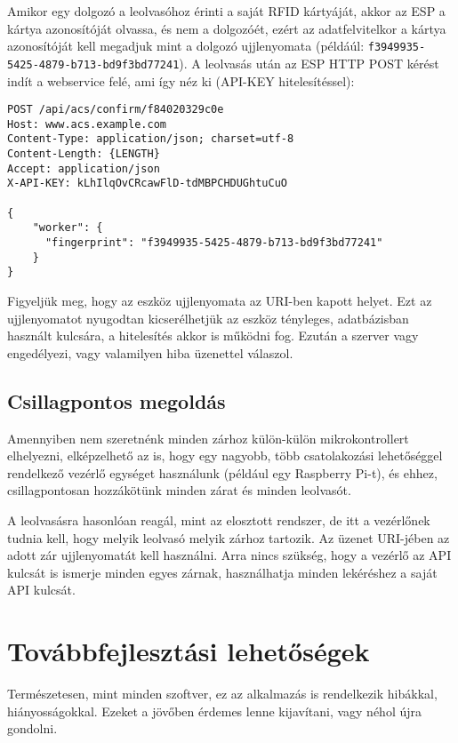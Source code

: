 \documentclass[a4paper,12pt]{thesis-ekf}
\theoremstyle{definition}
\begin{document}
			Amikor egy dolgozó a leolvasóhoz érinti a saját RFID kártyáját, akkor az ESP a kártya azonosítóját olvassa, és nem a dolgozóét, ezért az adatfelvitelkor a kártya azonosítóját kell megadjuk mint a dolgozó ujjlenyomata (példáúl: \texttt{f3949935-5425-4879-b713-bd9f3bd77241}). A leolvasás után az ESP HTTP POST kérést indít a webservice felé, ami így néz ki (API-KEY hitelesítéssel):
			
			\begin{lstlisting}[caption={Elosztott rendszer HTTP kérése}]
POST /api/acs/confirm/f84020329c0e
Host: www.acs.example.com
Content-Type: application/json; charset=utf-8
Content-Length: {LENGTH}
Accept: application/json
X-API-KEY: kLhIlqOvCRcawFlD-tdMBPCHDUGhtuCuO

{
	"worker": {
	  "fingerprint": "f3949935-5425-4879-b713-bd9f3bd77241"
	}
}
			\end{lstlisting}
			
			Figyeljük meg, hogy az eszköz ujjlenyomata az URI-ben kapott helyet. Ezt az ujjlenyomatot nyugodtan kicserélhetjük az eszköz tényleges, adatbázisban használt kulcsára, a hitelesítés akkor is működni fog. Ezután a szerver vagy engedélyezi, vagy valamilyen hiba üzenettel válaszol.
			
		\section{Csillagpontos megoldás}
			Amennyiben nem szeretnénk minden zárhoz külön-külön mikrokontrollert elhelyezni, elképzelhető az is, hogy egy nagyobb, több csatolakozási lehetőséggel rendelkező vezérlő egységet használunk (például egy Raspberry Pi-t), és ehhez, csillagpontosan hozzákötünk minden zárat és minden leolvasót. 
			
			A leolvasásra hasonlóan reagál, mint az elosztott rendszer, de itt a vezérlőnek tudnia kell, hogy melyik leolvasó melyik zárhoz tartozik. Az üzenet URI-jében az adott zár ujjlenyomatát kell használni. Arra nincs szükség, hogy a vezérlő az API kulcsát is ismerje minden egyes zárnak, használhatja minden lekéréshez a saját API kulcsát. 
			
	\chapter{Továbbfejlesztási lehetőségek}
		Természetesen, mint minden szoftver, ez az alkalmazás is rendelkezik hibákkal, hiányosságokkal. Ezeket a jövőben érdemes lenne kijavítani, vagy néhol újra gondolni.
		
\end{document}
